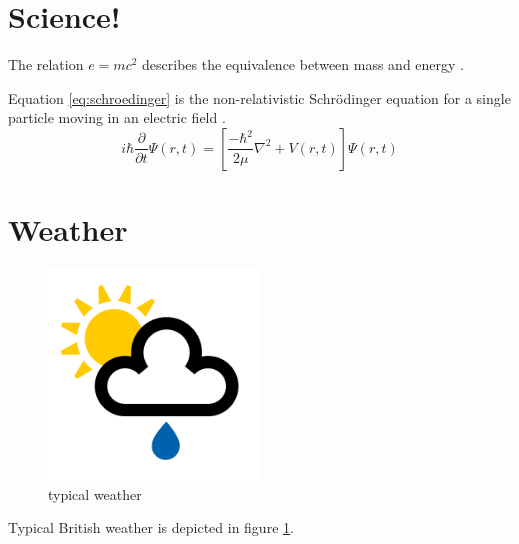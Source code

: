 \documentclass[a4paper,12pt]{article}  %
\begin{document}
\section{Science!}
The relation $e=mc^2$ describes the equivalence between mass and energy \citep{massenergy}.

Equation \ref{eq:schroedinger} is the non-relativistic Schr\"{o}dinger equation for a single particle moving in an electric field \citep[see][]{Schroedinger1926}.
\begin{equation}
	i\hbar \frac{\partial{}} {\partial{t}} \Psi(r,t) = \left[\frac{-\hbar^2}{2 \mu} \nabla ^2 + V(r,t)\right] \Psi(r,t)
	\label{eq:schroedinger}
\end{equation}

\section{Weather}
\begin{figure}[h]
	\centering
	\includegraphics[width=0.5\textwidth]{showers}
	\caption{typical weather}
	\label{fig:weather}
\end{figure}

Typical British weather is depicted in figure \ref{fig:weather}.



\end{document}
